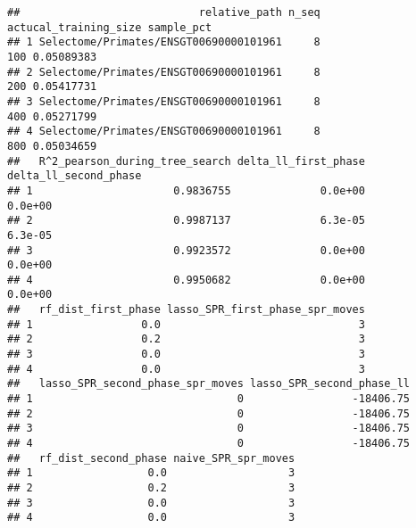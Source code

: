 \documentclass[
]{article}
\newenvironment{Shaded}{\begin{snugshade}}{\end{snugshade}}
\newcommand{\DataTypeTok}[1]{\textcolor[rgb]{0.13,0.29,0.53}{#1}}
\newcommand{\KeywordTok}[1]{\textcolor[rgb]{0.13,0.29,0.53}{\textbf{#1}}}
\newcommand{\NormalTok}[1]{#1}
\newcommand{\OperatorTok}[1]{\textcolor[rgb]{0.81,0.36,0.00}{\textbf{#1}}}
\newcommand{\StringTok}[1]{\textcolor[rgb]{0.31,0.60,0.02}{#1}}
\begin{document}
\begin{Shaded}
\end{Shaded}

\begin{verbatim}
##                            relative_path n_seq actucal_training_size sample_pct
## 1 Selectome/Primates/ENSGT00690000101961     8                   100 0.05089383
## 2 Selectome/Primates/ENSGT00690000101961     8                   200 0.05417731
## 3 Selectome/Primates/ENSGT00690000101961     8                   400 0.05271799
## 4 Selectome/Primates/ENSGT00690000101961     8                   800 0.05034659
##   R^2_pearson_during_tree_search delta_ll_first_phase delta_ll_second_phase
## 1                      0.9836755              0.0e+00               0.0e+00
## 2                      0.9987137              6.3e-05               6.3e-05
## 3                      0.9923572              0.0e+00               0.0e+00
## 4                      0.9950682              0.0e+00               0.0e+00
##   rf_dist_first_phase lasso_SPR_first_phase_spr_moves
## 1                 0.0                               3
## 2                 0.2                               3
## 3                 0.0                               3
## 4                 0.0                               3
##   lasso_SPR_second_phase_spr_moves lasso_SPR_second_phase_ll
## 1                                0                 -18406.75
## 2                                0                 -18406.75
## 3                                0                 -18406.75
## 4                                0                 -18406.75
##   rf_dist_second_phase naive_SPR_spr_moves
## 1                  0.0                   3
## 2                  0.2                   3
## 3                  0.0                   3
## 4                  0.0                   3
\end{verbatim}
\end{document}
